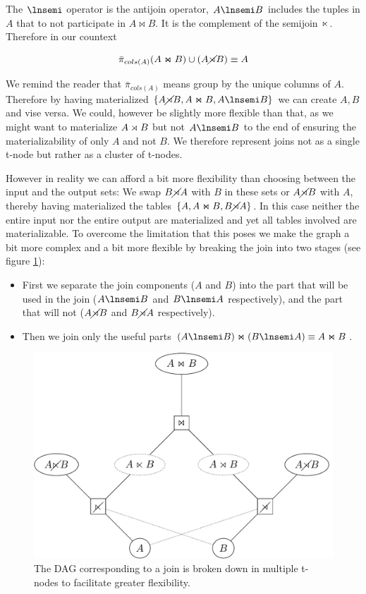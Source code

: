 The \(\lnsemi\) operator is the antijoin operator, \(A \lnsemi B\)
includes the tuples in \(A\) that to not participate in \(A \Join B\). It
is the complement of the semijoin \(\ltimes\). Therefore in our
countext

\[ \bar{\pi}_{cols(A)}(A \Join B) \cup (A \cancel\rtimes B) \equiv A \]

We remind the reader that \(\bar{\pi}_{cols(A)}\) means group by the
unique columns of \(A\). Therefore by having materialized \(\{A \rnsemi B, A
\Join B, A \lnsemi B\}\) we can create \({A,B}\) and vise versa. We could,
however be slightly more flexible than that, as we might want to
materialize \(A \rtimes B\) but not \(A \lnsemi B\) to the end of ensuring
the materializability of only \(A\) and not \(B\). We therefore
represent joins not as a single t-node but rather as a cluster of
t-nodes.

However in reality we can afford a bit more flexibility than
choosing between the input and the output sets: We swap \(B \cancel\rtimes A\)
with \(B\) in these sets or \(A \cancel\rtimes B\) with \(A\), thereby having
materialized the tables \(\{A, A \Join B, B \cancel\rtimes A\}\). In this case
neither the entire input nor the entire output are materialized
and yet all tables involved are materializable. To overcome the
limitation that this poses we make the graph a bit more complex
and a bit more flexible by breaking the join into two stages (see
figure \ref{fig:orgceabc4f}):

\begin{itemize}
\item First we separate the join components (\(A\) and \(B\)) into the
  part that will be used in the join (\(A \lnsemi B\) and \(B \lnsemi A\)
  respectively), and the part that will not (\(A \cancel\rtimes B\) and
  \(B \cancel\rtimes A\) respectively).
\item Then we join only the useful parts
  \((A \lnsemi B) \Join (B \lnsemi A) \equiv A \Join B\).
\end{itemize}


\begin{figure}[p]
  \centering
  \includegraphics[width=.9\linewidth]{./imgs/joinnet.pdf}
  \caption{\label{fig:orgceabc4f}The DAG corresponding to a join is broken down in multiple t-nodes to facilitate greater flexibility.}
\end{figure}


